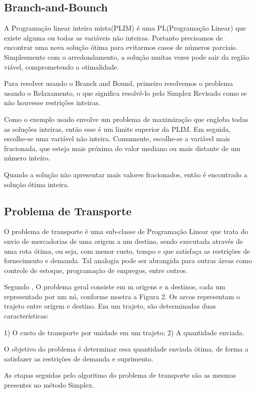 \documentclass [11pt]{articleSBPO}
\begin{document}
\subsection{Branch-and-Bounch}

A Programação linear inteira mista(PLIM) é uma PL(Programação Linear) que existe alguma ou todas as variáveis não inteiras. Portanto precisamos de encontrar uma nova solução ótima para evitarmos casos de números parciais. Simplesmente com o arredondamento, a solução muitas vezes pode sair da região viável, comprometendo a otimalidade. 

Para resolver usando o Branch and Bound, primeiro resolvemos o problema usando o Relaxamento, o que significa resolvê-lo pelo Simplex Revisado como se não houvesse restriçőes inteiras.

Como o exemplo usado envolve um problema de maximização que engloba todas as soluçőes inteiras, então esse é um limite superior da PLIM. Em seguida, escolhe-se uma variável não inteira. Comumente, escolhe-se a variável mais fracionada, que esteja mais próxima do valor mediano ou mais distante de um número inteiro.

Quando a solução não apresentar mais valores fracionados, então é encontrado a solução ótima inteira. 

\subsection{Problema de Transporte}

O problema de transporte é uma sub-classe de Programação Linear que trata do envio de mercadorias de uma origem a um destino, sendo executada através de uma rota ótima, ou seja, com menor custo, tempo e que satisfaça as restrições de fornecimento e demanda. Tal analogia pode ser abrangida para outras áreas como controle de estoque, programação de empregos, entre outros.

Segundo \cite{TAHA}, O problema geral consiste em m origens e n destinos, cada um representado por um nó, conforme mostra a Figura 2. Os arcos representam o trajeto entre origem e destino. Em um trajeto, são determinadas duas características:

    1) O custo de transporte por unidade em um trajeto;
    2) A quantidade enviada.

O objetivo do problema é determinar essa quantidade enviada ótima, de forma a satisfazer as restrições de demanda e suprimento.

As etapas seguidas pelo algoritmo do problema de transporte são as mesmas presentes no método Simplex.
\end{document}
